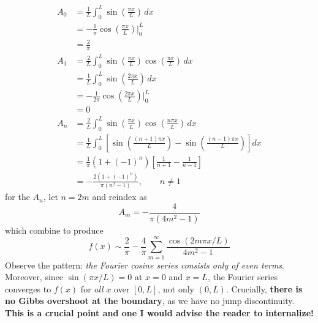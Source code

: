 \documentclass[a4paper]{article}
\begin{document}
\begin{align*}
	A_{0} & = \frac{1}{L}\int^{L}_{0} \sin\!\left(\frac{\pi x}{L}\right) \, dx \\
	 & = -\frac{1}{\pi}\cos\!\left(\frac{\pi x}{L}\right)\Big|^{L}_{0} \\ 
	 & = \frac{2}{\pi} \\
	A_{1} & = \frac{2}{L}\int^{L}_{0} \sin\!\left(\frac{\pi x}{L}\right)\cos\!\left(\frac{\pi x}{L}\right) \, dx \\
	      & = \frac{1}{L}\int^{L}_{0} \sin\!\left(\frac{2\pi x}{L}\right) \, dx \\
      & = -\frac{1}{2\pi}\cos\!\left(\frac{2\pi x}{L}\right)\Big|^{L}_{0} \\
      & = 0 \\
	A_{n} & = \frac{2}{L}\int^{L}_{0} \sin\!\left(\frac{\pi x}{L}\right)\cos\!\left(\frac{n \pi x}{L}\right) \, dx \\
	      & = \frac{1}{L}\int^{L}_{0} \left[\sin\!\left(\frac{(n+1) \pi x}{L}\right) - \sin\!\left(\frac{(n-1) \pi x}{L}\right)\right] dx \\
      & = \frac{1}{\pi}\left(1 + (-1)^{n}\right)\left[\frac{1}{n+1} - \frac{1}{n-1}\right] \\
      & = -\frac{2\left(1 + (-1)^n\right)}{\pi\left(n^2 - 1\right)}, \qquad n \neq 1
\end{align*}
for the \( A_{n} \), let \( n = 2m \) and reindex as 
\[
	A_{m} = -\frac{4}{\pi \!\left( 4m^{2} - 1 \right)} 
\]
which combine to produce
\[
	f \!\left( x \right) \sim \frac{2}{\pi} - \frac{4}{\pi}\sum^{\infty}_{m=1} \frac{\cos\!\left(2m \pi x / L\right)}{4m^{2} - 1}
\]
Observe the pattern: \textit{the Fourier cosine series consists only of even terms}. Moreover, since \( \sin\!\left(\pi x / L\right) = 0 \) at \( x = 0 \) and \( x = L \), the Fourier series converges to \( f \!\left( x \right) \) for \textit{all} \( x \) over \( \!\left[ 0,L \right] \), not only \( \!\left( 0,L \right) \). Crucially, \textbf{there is no Gibbs overshoot at the boundary}, as we have no jump discontinuity. \textbf{This is a crucial point and one I would advise the reader to internalize!}

\vspace{12pt}

\end{document}
